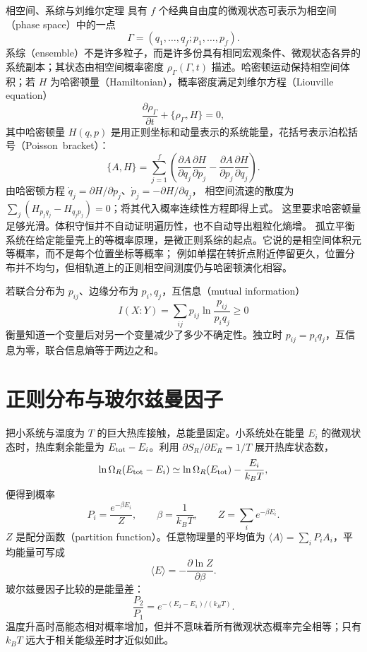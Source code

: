 \begingroup{}\begin{starread}{相空间、系综与刘维尔定理}
具有 $f$ 个经典自由度的微观状态可表示为相空间（phase space）中的一点
\[
 \Gamma=(q_1,\ldots,q_f;p_1,\ldots,p_f).
\]
系综（ensemble）不是许多粒子，而是许多份具有相同宏观条件、微观状态各异的系统副本；其状态由相空间概率密度
$\rho_\Gamma(\Gamma,t)$ 描述。哈密顿运动保持相空间体积；若 $H$ 为哈密顿量（Hamiltonian），概率密度满足刘维尔方程（Liouville equation）
\[
 \frac{\partial\rho_\Gamma}{\partial t}+\{\rho_\Gamma,H\}=0,
\]
其中哈密顿量 $H(q,p)$ 是用正则坐标和动量表示的系统能量，花括号表示泊松括号（\mbox{Poisson bracket}）：
\[\{A,H\}=\sum_{j=1}^{f}\left(\frac{\partial A}{\partial q_j}\frac{\partial H}{\partial p_j}
-\frac{\partial A}{\partial p_j}\frac{\partial H}{\partial q_j}\right).\]
由哈密顿方程 $\dot q_j=\partial H/\partial p_j$、$\dot p_j=-\partial H/\partial q_j$，
相空间流速的散度为 $\sum_j(H_{p_jq_j}-H_{q_jp_j})=0$；将其代入概率连续性方程即得上式。
这里要求哈密顿量足够光滑。体积守恒并不自动证明遍历性，也不自动导出粗粒化熵增。
孤立平衡系统在给定能量壳上的等概率原理，是微正则系综的起点。它说的是相空间体积元等概率，而不是每个位置坐标等概率；
例如单摆在转折点附近停留更久，位置分布并不均匀，但相轨道上的正则相空间测度仍与哈密顿演化相容。

若联合分布为 $p_{ij}$、边缘分布为 $p_i,q_j$，互信息（mutual information）
\[
 I(X{:}Y)=\sum_{ij}p_{ij}\ln\frac{p_{ij}}{p_iq_j}\ge0
\]
衡量知道一个变量后对另一个变量减少了多少不确定性。独立时 $p_{ij}=p_iq_j$，互信息为零，联合信息熵等于两边之和。
\end{starread}\endgroup

\section{正则分布与玻尔兹曼因子}

把小系统与温度为 $T$ 的巨大热库接触，总能量固定。小系统处在能量 $E_i$ 的微观状态时，热库剩余能量为
$E_{\rm tot}-E_i$。利用 $\partial S_R/\partial E_R=1/T$ 展开热库状态数，
\[
 \ln\Omega_R(E_{\rm tot}-E_i)
 \simeq\ln\Omega_R(E_{\rm tot})-\frac{E_i}{k_BT},
\]
便得到概率
\begin{equation}
 P_i=\frac{e^{-\beta E_i}}{Z},\qquad
 \beta=\frac1{k_BT},\qquad
 Z=\sum_i e^{-\beta E_i}.
\end{equation}
$Z$ 是配分函数（partition function）。任意物理量的平均值为 $\langle A\rangle=\sum_iP_iA_i$，平均能量可写成
\begin{equation}
 \langle E\rangle=-\frac{\partial\ln Z}{\partial\beta}.
\end{equation}
玻尔兹曼因子比较的是能量差：
\begin{equation}
 \frac{P_2}{P_1}=e^{-(E_2-E_1)/(k_BT)}.
\end{equation}
温度升高时高能态相对概率增加，但并不意味着所有微观状态概率完全相等；只有 $k_BT$ 远大于相关能级差时才近似如此。

